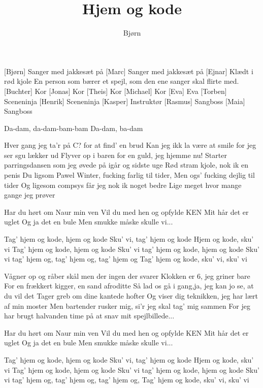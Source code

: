 \documentclass[a4paper,11pt]{article}
\title{Hjem og kode}
\author{Bjørn}
\begin{document}
\maketitle

\begin{roles}
  [Bjørn] Sanger med jakkesæt på
  [Marc] Sanger med jakkesæt på
  [Ejnar] Klædt i rød kjole
   En person som bærer et spejl, som den ene sanger skal flirte med.
  [Buchter] Kor
  [Jonas] Kor
  [Theis] Kor
  [Michael] Kor
  [Eva] Eva
  [Torben] Sceneninja
  [Henrik] Sceneninja
  [Kasper] Instruktør
  [Rasmus] Sangboss
  [Maia] Sangboss
\end{roles}

\begin{song}


 Da-dam, da-dam-bam-bam
 Da-dam, ba-dam

%
Hver gang jeg ta'r på C? for at find' en brud
Kan jeg ikk la være at smile for jeg ser sgu lækker ud
Flyver op i baren for en guld, jeg hjemme nu!
Starter parringsdansen som jeg øvede på igår og sidste  uge
Rød stram kjole, nok ik en penis
Du ligsom Pawel Winter, fucking farlig til tider,
Men ogs' fucking dejlig til tider
Og ligesom compsys får jeg nok ik noget bedre
Lige meget hvor mange gange jeg prøver

%
Har du hørt om Naur min ven
Vil du med hen og opfylde KEN
Mit hår det er uglet
Og ja det en bule
Men smukke måske skulle vi...

%
Tag' hjem og kode, hjem og kode
Sku' vi, tag' hjem og kode
Hjem og kode, sku' vi
Tag' hjem og kode, hjem og kode
Sku' vi tag' hjem og kode, hjem og kode
Sku' vi tag' hjem og, tag' hjem og, tag' hjem og
Tag' hjem og kode, sku' vi, sku' vi

%
Vågner op og råber skål men der ingen der svarer
Klokken er 6, jeg griner bare
For en frækkert kigger, en sand afroditte
Så lad os gå i gang,ja, jeg kan jo se, at du vil det
Tager greb om dine kantede hofter
Og viser dig teknikken, jeg har lært af min moster
Men bartender rusker mig, si'r jeg skal tag' mig sammen
For jeg har brugt halvanden time på at snav mit spejlbillede...

%
Har du hørt om Naur min ven
Vil du med hen og opfylde KEN
Mit hår det er uglet
Og ja det en bule
Men smukke måske skulle vi...

%
Tag' hjem og kode, hjem og kode
Sku' vi, tag' hjem og kode
Hjem og kode, sku' vi
Tag' hjem og kode, hjem og kode
Sku' vi tag' hjem og kode, hjem og kode
Sku' vi tag' hjem og, tag' hjem og, tag' hjem og,
Tag' hjem og kode, sku' vi, sku' vi
\end{song}
\end{document}
